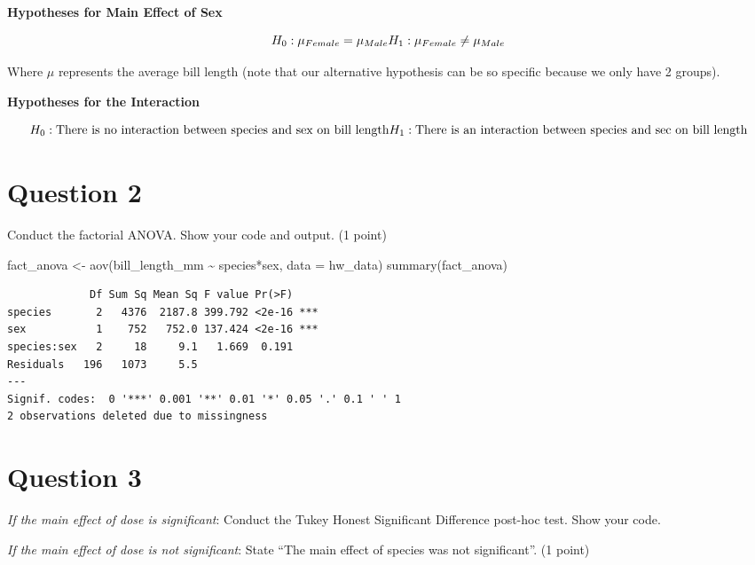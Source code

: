 \documentclass[
  letterpaper,
  DIV=11,
  numbers=noendperiod]{scrartcl}
\newenvironment{Shaded}{\begin{snugshade}}{\end{snugshade}}
\newcommand{\AttributeTok}[1]{\textcolor[rgb]{0.40,0.45,0.13}{#1}}
\newcommand{\FunctionTok}[1]{\textcolor[rgb]{0.28,0.35,0.67}{#1}}
\newcommand{\NormalTok}[1]{\textcolor[rgb]{0.00,0.23,0.31}{#1}}
\newcommand{\OtherTok}[1]{\textcolor[rgb]{0.00,0.23,0.31}{#1}}
\newcommand{\SpecialCharTok}[1]{\textcolor[rgb]{0.37,0.37,0.37}{#1}}
\begin{document}
\textbf{Hypotheses for Main Effect of Sex}

\[
H_0: \mu_{Female} = \mu_{Male}\\
H_1: \mu_{Female} \neq \mu_{Male}
\]

Where \(\mu\) represents the average bill length (note that our
alternative hypothesis can be so specific because we only have 2
groups).

\textbf{Hypotheses for the Interaction}

\[
H_0: \text{There is no interaction between species and sex on bill length}\\
H_1: \text{There is an interaction between species and sec on bill length}
\]

\section{Question 2}\label{question-2}

Conduct the factorial ANOVA. Show your code and output. (1 point)

\begin{Shaded}
\begin{Highlighting}[]
\NormalTok{fact\_anova }\OtherTok{\textless{}{-}} \FunctionTok{aov}\NormalTok{(bill\_length\_mm }\SpecialCharTok{\textasciitilde{}}\NormalTok{ species}\SpecialCharTok{*}\NormalTok{sex, }\AttributeTok{data =}\NormalTok{ hw\_data)}
\FunctionTok{summary}\NormalTok{(fact\_anova)}
\end{Highlighting}
\end{Shaded}

\begin{verbatim}
             Df Sum Sq Mean Sq F value Pr(>F)    
species       2   4376  2187.8 399.792 <2e-16 ***
sex           1    752   752.0 137.424 <2e-16 ***
species:sex   2     18     9.1   1.669  0.191    
Residuals   196   1073     5.5                   
---
Signif. codes:  0 '***' 0.001 '**' 0.01 '*' 0.05 '.' 0.1 ' ' 1
2 observations deleted due to missingness
\end{verbatim}

\section{Question 3}\label{question-3}

\emph{If the main effect of dose is significant}: Conduct the Tukey
Honest Significant Difference post-hoc test. Show your code.

\emph{If the main effect of dose is not significant}: State ``The main
effect of species was not significant''. (1 point)
\end{document}
